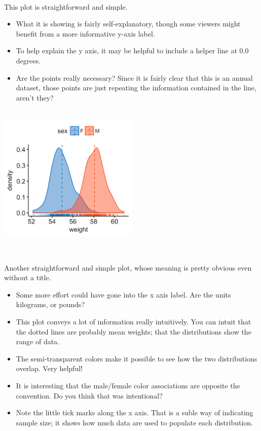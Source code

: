 \documentclass[
]{book}
\providecommand{\tightlist}{%
  \setlength{\itemsep}{0pt}\setlength{\parskip}{0pt}}
\begin{document}
~

This plot is straightforward and simple.

\begin{itemize}
\tightlist
\item
  What it is showing is fairly self-explanatory, though some viewers might benefit from a more informative y-axis label.
\item
  To help explain the y axis, it may be helpful to include a helper line at 0.0 degrees.\\
\item
  Are the points really necessary? Since it is fairly clear that this is an annual dataset, those points are just repeating the information contained in the line, aren't they?
\end{itemize}

~\\

\includegraphics[width=0.5\textwidth,height=\textheight]{img/visf.png}

~

Another straightforward and simple plot, whose meaning is pretty obvious even without a title.

\begin{itemize}
\tightlist
\item
  Some more effort could have gone into the x axis label. Are the units kilograms, or pounds?
\item
  This plot conveys a lot of information really intuitively. You can intuit that the dotted lines are probably mean weights; that the distributions show the range of data.\\
\item
  The semi-transparent colors make it possible to see how the two distributions overlap. Very helpful!
\item
  It is interesting that the male/female color associations are opposite the convention. Do you think that was intentional?\\
\item
  Note the little tick marks along the x axis. That is a suble way of indicating sample size; it shows how much data are used to populate each distribution.
\end{itemize}
\end{document}
